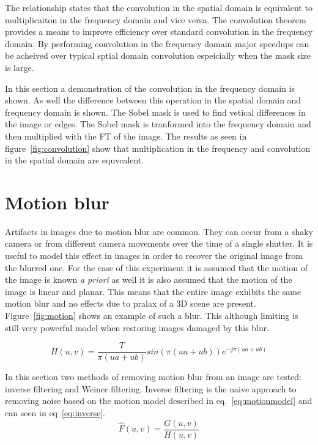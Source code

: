 \documentclass[letterpaper]{article}
\begin{document}
The relationship states that the convolution in the spatial domain is equivalent to multiplicaiton in the frequency domain and vice versa. The convolution theorem provides a means to improve efficiency over standard convolution in the frequency domain. By performing convolution in the frequency domain major speedups can be acheived over typical sptial domain convolution espeicially when the mask size is large.

In this section a demonstration of the convolution in the frequency domain is shown. As well the difference between this operation in the spatial domain and frequency domain is shown. The Sobel mask is used to find vetical differences in the image or edges. The Sobel mask is tranformed into the frequency domain and then multiplied with the FT of the image. The results as seen in figure~\ref{fig:convolution} show that multiplication in the frequency and convolution in the spatial domain are equvcalent.
\section{Motion blur}
Artifacts in images due to motion blur are common. They can occur from a shaky camera or from different camera movements over the time of a single shutter. It is useful to model this effect in images in order to recover the original image from the blurred one. For the case of this experiment it is assumed that the motion of the image is known \emph{a priori} as well it is also assumed that the motion of the image is linear and planar. This means that the entire image exhibits the same motion blur and no effects due to pralax of a 3D scene are present. Figure~\ref{fig:motion} shows an example of such a blur. This although limiting is still very powerful model when restoring images damaged by this blur.

\begin{equation} \label{eq:motionmodel}
H(u,v)=\frac{T}{\pi (ua + ub)}sin(\pi (ua + ub))e^{-j\pi (ua + ub)}
\end{equation}

In this section two methods of removing motion blur from an image are tested: inverse filtering and Weiner filtering. Inverse filtering is the naive approach to removing noise based on the motion model described in eq.~\ref{eq:motionmodel} and can seen in eq~\ref{eq:inverse}.
\begin{equation} \label{eq:inverse}
\hat{F}(u,v)=\frac{G(u,v)}{H(u,v)}
\end{equation}
\end{document}
